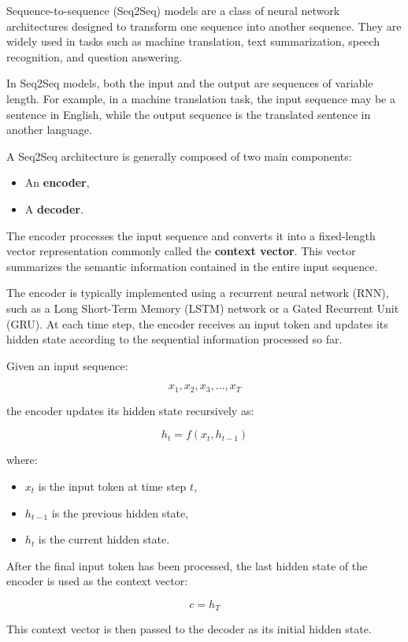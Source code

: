 Sequence-to-sequence (Seq2Seq) models are a class of neural network architectures
designed to transform one sequence into another sequence. They are widely used in
tasks such as machine translation, text summarization, speech recognition, and
question answering.

In Seq2Seq models, both the input and the output are sequences of variable length.
For example, in a machine translation task, the input sequence may be a sentence in
English, while the output sequence is the translated sentence in another language.

A Seq2Seq architecture is generally composed of two main components:

\begin{itemize}
    \item An \textbf{encoder},
    \item A \textbf{decoder}.
\end{itemize}

The encoder processes the input sequence and converts it into a fixed-length vector
representation commonly called the \textbf{context vector}. This vector summarizes
the semantic information contained in the entire input sequence.

The encoder is typically implemented using a recurrent neural network (RNN), such as
a Long Short-Term Memory (LSTM) network or a Gated Recurrent Unit (GRU). At each
time step, the encoder receives an input token and updates its hidden state according
to the sequential information processed so far.

Given an input sequence:

\[
x_1, x_2, x_3, \dots, x_T
\]

the encoder updates its hidden state recursively as:

\[
h_t = f(x_t, h_{t-1})
\]

where:

\begin{itemize}
    \item $x_t$ is the input token at time step $t$,
    \item $h_{t-1}$ is the previous hidden state,
    \item $h_t$ is the current hidden state.
\end{itemize}

After the final input token has been processed, the last hidden state of the encoder
is used as the context vector:

\[
c = h_T
\]

This context vector is then passed to the decoder as its initial hidden state.

